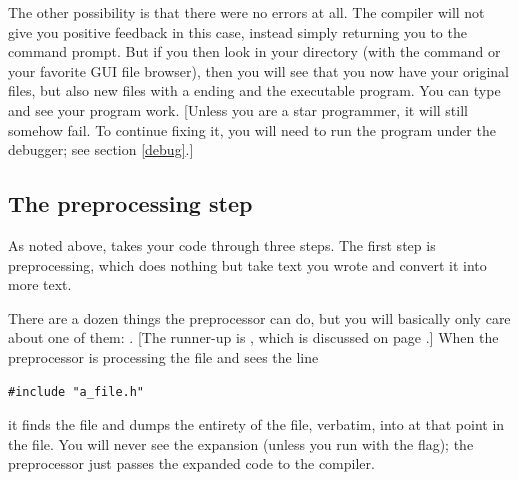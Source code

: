 \documentclass[12pt]{article}
\makeatletter
\def\cind#1{\index{#1@\cinline{#1}}\cinline{#1}}
\makeatother
\begin{document}
The other possibility is that there were no errors at all. The compiler
will not give you positive feedback in this case, instead simply returning
you to the command prompt. But if you then look in your directory
(with the command  or your favorite GUI file browser),
then you will see that you now have your original  files,
but also new files with a  ending and the 
executable program. You can type  and see your program
work. [Unless you are a star programmer, it will still somehow fail. To
continue fixing it, you will need to run the program under the debugger;
see section \ref{debug}.]

\subsection{The preprocessing step} \label{headers}
As noted above,  takes your code through three steps.
The first step is preprocessing,
which does nothing but take text 
you wrote and convert it into more text.

There are a dozen things the preprocessor can do, but you will basically only care about one of them: \cind{\#include}. 
[The runner-up is , which is discussed on page \pageref{macros}.] 
When the preprocessor is processing the file  and sees
the line
\begin{lstlisting}
#include "a_file.h"
\end{lstlisting}
it finds the file  and dumps the entirety of the file,
verbatim, into  at that point in the file. You will never
see the expansion (unless you run  with the 
flag); the preprocessor just passes the expanded code to the compiler.
\end{document}
